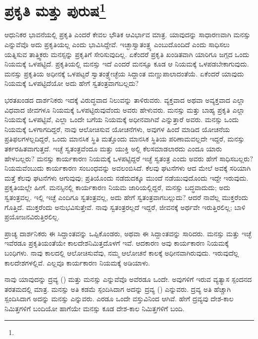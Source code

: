 
\chapter{ಪ್ರಕೃತಿ ಮತ್ತು ಪುರುಷ\protect\footnote{}}

ಆಧುನಿಕರ ಭಾವನೆಯಲ್ಲಿ ಪ್ರಕೃತಿ ಎಂದರೆ ಕೇವಲ ಭೌತಿಕ ಆವಿರ್ಭಾವ ಮಾತ್ರ. ಯಾವುದನ್ನು ಸಾಧಾರಣವಾಗಿ ಮನಸ್ಸು ಎನ್ನುವೆವೊ ಅದು ಪ್ರಕೃತಿಯಲ್ಲ ಎಂದು ಭಾವಿಸಿದ್ದೇವೆ. ಇಚ್ಛಾಸ್ವಾತಂತ್ರ್ಯ ಎಂಬುದೊಂದಿದೆ ಎಂದು ಸಾಧಿಸಲು ಯತ್ನಿಸುವ ತಾತ್ತ್ವಿಕರು ಮನಸ್ಸನ್ನು ಪ್ರಕೃತಿಗೆ ಸೇರಿಸುವುದಿಲ್ಲ. ಏಕೆಂದರೆ ಪ್ರಕೃತಿ ಖಂಡಿತವಾಗಿ ಯಾರಿಗೂ ಜಗ್ಗದ ಒಂದು ನಿಯಮಕ್ಕೆ ಒಳಪಟ್ಟಿದೆ. ಪ್ರಕೃತಿಯಲ್ಲಿ ಮನಸ್ಸು ಇದೆ ಎಂದರೆ ಮನಸ್ಸೂ ಕೂಡ ಆ ನಿಯಮಕ್ಕೆ ಒಳಪಡಬೇಕಾಗುವುದು. ಮನಸ್ಸು ಪ್ರಕೃತಿಯ ಅಧೀನಕ್ಕೆ ಒಳಪಟ್ಟರೆ ಸ್ವಾತಂತ್ರ್ಯೇಚ್ಛೆಯ ಸಿದ್ದಾಂತ ಮಣ್ಣುಪಾಲಾದಂತೆಯೆ. ಏಕೆಂದರೆ ಯಾವುದು ನಿಯಮಕ್ಕೆ ಒಳಪಟ್ಟಿದೆಯೋ ಅದು ಹೇಗೆ ಸ್ವತಂತ್ರವಾಗಬಲ್ಲದು?

ಭರತಖಂಡದ ದಾರ್ಶನಿಕರು ಇದಕ್ಕೆ ವಿರುದ್ಧವಾದ ನಿಲುವನ್ನು ತಾಳಿರುವರು. ವ್ಯಕ್ತವಾದ ಅಥವಾ ಅವ್ಯಕ್ತವಾದ ಎಲ್ಲಾ ವಿಧವಾದ ಜೀವಗಳೂ ನಿಯಮಕ್ಕೆ ಒಳಪಟ್ಟಿರುವುವೆಂದು ಅವರು ಹೇಳುವರು. ಮನಸ್ಸು ಮತ್ತು ಬಾಹ್ಯ ಪ್ರಕೃತಿ ಎಲ್ಲಾ ನಿಯಮಕ್ಕೆ ಒಳಪಟ್ಟಿವೆ, ಎಲ್ಲಾ ಒಂದೇ ಬಗೆಯ ನಿಯಮಕ್ಕೆ ಅಧೀನವಾಗಿವೆ ಎನ್ನುತ್ತಾರೆ ಅವರು. ಮನಸ್ಸು ಒಂದು ನಿಯಮಕ್ಕೆ ಒಳಗಾಗದಿದ್ದರೆ, ನಾವು ಆಲೋಚಿಸುವ ಯೋಚನೆಗಳು, ಅವುಗಳ ಹಿಂದೆ ಮಾಡಿದ ಯೋಚನೆಯ ಪ್ರತಿಫಲಗಳಲ್ಲದಿದ್ದರೆ, ಒಂದು ಮಾನಸಿಕ ಸ್ಥಿತಿ ಮತ್ತೊಂದು ಮಾನಸಿಕ ಸ್ಥಿತಿಯ ಪರಿಣಾಮವಲ್ಲದೇ ಇದ್ದರೆ, ಮನಸ್ಸು ತರ್ಕರಹಿತವಾಗುತ್ತದೆ. ಇಚ್ಛೆ ಸ್ವತಂತ್ರವೆಂದೂ ಮತ್ತು ಯುಕ್ತಿ ಅಲ್ಲಿ ಕೆಲಸಮಾಡಲಾರದು ಎಂದೂ ಯಾರು ಹೇಳಬಲ್ಲರು? ಮನಸ್ಸು ಕಾರ್ಯಕಾರಣ ನಿಯಮಕ್ಕೆ ಒಳಪಟ್ಟಿದ್ದರೆ ಇಚ್ಛೆ ಸ್ವತಂತ್ರ ಎಂದು ಅವರು ಹೇಗೆ ಸಾಧಿಸಬಲ್ಲರು? ನಿಯಮವೆಂಬುದು ಕಾರ್ಯಕಾರಣ ಸಂಬಂಧವನ್ನು ಅವಲಂಬಿಸಿದೆ. ಕೆಲವು ಘಟನೆಗಳು ಆದ ಮೇಲೆ ಅವಕ್ಕೆ ಸರಿಯಾಗಿ ಮತ್ತೆ ಕೆಲವು ಘಟನೆಗಳು ಆಗುವುವು; ಪ್ರತಿಯೊಂದು ನಡೆದುದಕ್ಕೂ ಮುಂದೆ ನಡೆಯುವುದೊಂದು ಇದ್ದೇ ಇರುವುದು. ಪ್ರಕೃತಿಯಲ್ಲೇ ಹೀಗೆ. ಮನಸ್ಸಿನಲ್ಲಿ ಕಾರ್ಯಕಾರಣ ನಿಯಮ ಜಾರಿಯಲ್ಲಿದ್ದರೆ, ಮನಸ್ಸು ಬದ್ಧವಾದುದು; ಅದು ಸ್ವತಂತ್ರವಲ್ಲ. ಇಲ್ಲಿ ಇಚ್ಛೆ ಎಂದಿಗೂ ಸ್ವತಂತ್ರವಲ್ಲ, ಅದು ಹೇಗೆ ಸ್ವತಂತ್ರವಾಗಬಲ್ಲುದು? ಆದರೆ ನಾವೆಲ್ಲ ಮುಕ್ತರೆಂದು ಗೊತ್ತಿದೆ. ಮುಕ್ತರೆಂದು ಅನುಭವಿಸುತ್ತೇವೆ. ನಾವು ಸ್ವತಂತ್ರರಲ್ಲದೆ ಇದ್ದರೆ, ಜೀವನಕ್ಕೆ ಅರ್ಥವೇ ಇರುತ್ತಿರಲಿಲ್ಲ; ಬಾಳಿ ಪ್ರಯೋಜನವಿರುತ್ತಿರಲಿಲ್ಲ.

ಪ್ರಾಚ್ಯ ದಾರ್ಶನಿಕರು ಈ ಸಿದ್ದಾಂತವನ್ನು ಒಪ್ಪಿಕೊಂಡರು, ಅಥವಾ ಈ ಸಿದ್ದಾಂತವನ್ನು ಸಾರಿದರು. ಮನಸ್ಸು ಮತ್ತು ಇಚ್ಛೆ ಇವೆರಡೂ ಪ್ರಕೃತಿಯಂತೆಯೇ ಕಾಲದೇಶನಿಮಿತ್ತದೊಳಗೆ ಇವೆ. ಆದಕಾರಣ ಅವು ಕಾರ್ಯಕಾರಣ ನಿಯಮಕ್ಕೆ ಬಂಧಿಗಳು. ನಾವು ಕಾಲದಲ್ಲಿ ಆಲೋಚಿಸುವೆವು, ನಮ್ಮ ಆಲೋಚನೆ ಕಾಲಕ್ಕೆ ಅಧೀನವಾಗಿರುವುದು. ಇರುವುದೆಲ್ಲ ಕಾಲದೇಶಗಳಲ್ಲಿವೆ. ಎಲ್ಲವೂ ಕಾರ್ಯಕಾರಣ ನಿಯಮಕ್ಕೆ ಅಡಿಯಾಳು.

ನಾವು ಯಾವುದನ್ನು ದ್ರವ್ಯ () ಮತ್ತು ಮನಸ್ಸು ಎನ್ನುವೆವೊ ಅವೆರಡೂ ಒಂದೇ. ಅವುಗಳಿಗೆ ಇರುವ ವ್ಯತ್ಯಾಸ ಸ್ಪಂದನದ ತರತಮದಲ್ಲಿ ಮಾತ್ರ. ಮನಸ್ಸು ಅತಿ ಕಡಮೆ ಸ್ಪಂದಿಸಿದಾಗ ಅದನ್ನು ದ್ರವ್ಯ () ಎನ್ನುವರು. ದ್ರವ್ಯ ಅತಿ ಹೆಚ್ಚಾಗಿ ಸ್ಪಂದಿಸಿದಾಗ ಅದನ್ನು ಮನಸ್ಸು ಎನ್ನುವರು. ಎರಡೂ ಒಂದೇ ವಸ್ತುವಿನಿಂದ ಆಗಿವೆ. ಹೇಗೆ ದ್ರವ್ಯವು ದೇಶ-ಕಾಲ ನಿಮಿತ್ತಗಳಿಗೆ ಬಂದಿಯೋ ಹಾಗೆಯೇ ಮನಸ್ಸು ಕೂಡ ದೇಶ-ಕಾಲ ನಿಮಿತ್ತಗಳಿಗೆ ಬಂದಿ.

